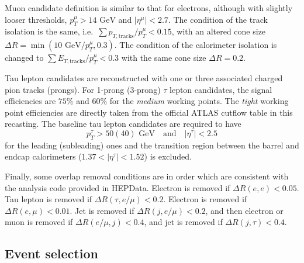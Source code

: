 \documentclass{ws-mpla}
\begin{document}
Muon candidate definition is similar to that for electrons, although with slightly looser thresholds,
$p^{\mu}_T > 14 \textrm{ GeV}$ and $|\eta^{\mu}| < 2.7$.
The condition of the track isolation is the same, i.e.\
$\sum p_{T,\textrm{tracks}}/p^{\mu}_T < 0.15$,
with an altered cone size
$\Delta R=\min(10\textrm{ GeV}/p^{\mu}_T,0.3)$.
The condition of the calorimeter isolation is changed to
$\sum E_{T,\textrm{tracks}}/p^{\mu}_T < 0.3$
with the same cone size $\Delta R=0.2$.

Tau lepton candidates are reconstructed with one or three associated charged pion tracks (prongs). %
For 1-prong (3-prong) $\tau$ lepton candidates, the signal efficiencies are $75\%$ and $60\%$ for the \textit{medium} working points. 
{\color{blue}The \textit{tight} working point efficiencies are directly taken from the official ATLAS cutflow table in this recasting.}
The baseline tau lepton candidates are required to have 
\begin{equation}
p^{\tau}_T > 50(40) \textrm{ GeV}\quad \textrm{and}\quad |\eta^{\tau}| < 2.5
\end{equation}
for the leading (subleading) ones and the transition region between the barrel and endcap calorimeters ($ 1.37 < |\eta^{\tau}| < 1.52 $) is excluded.

Finally, some overlap removal conditions are in order which are consistent with the analysis code provided in HEPData\cite{hepdata}. Electron is removed if $\Delta R(e,e) < 0.05$. Tau lepton is removed if $\Delta R(\tau,e/\mu) < 0.2$. Electron is removed if $\Delta R(e,\mu) < 0.01$. Jet is removed if $\Delta R(j,e/\mu) < 0.2$, and then electron or muon is removed if $\Delta R(e/\mu,j) < 0.4$, and jet is removed if $\Delta R(j,\tau) < 0.4$.


\subsection{Event selection}
\end{document}
